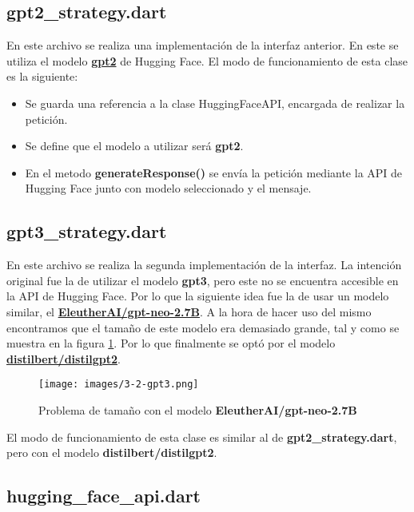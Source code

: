 \documentclass[12pt]{article}
\begin{document}
\subsection{gpt2\_strategy.dart}
En este archivo se realiza una implementación de la interfaz anterior. En este se utiliza el modelo \href{https://huggingface.co/openai-community/gpt2}{\textbf{gpt2}} de Hugging Face. El modo de funcionamiento de esta clase es la siguiente:

\begin{itemize}
    \item Se guarda una referencia a la clase HuggingFaceAPI, encargada de realizar la petición.
    \item Se define que el modelo a utilizar será \textbf{gpt2}.
    \item En el metodo \textbf{generateResponse()} se envía la petición mediante la API de Hugging Face junto con modelo seleccionado y el mensaje.
\end{itemize}

\subsection{gpt3\_strategy.dart}

En este archivo se realiza la segunda implementación de la interfaz.
La intención original fue la de utilizar el modelo \textbf{gpt3}, pero este no se encuentra accesible en la API de Hugging Face. Por lo que la siguiente idea fue la de usar un modelo similar, el \href{https://huggingface.co/EleutherAI/gpt-neo-2.7B}{\textbf{EleutherAI/gpt-neo-2.7B}}.
A la hora de hacer uso del mismo encontramos que el tamaño de este modelo era demasiado grande, tal y como se muestra en la figura \ref{fig:3-2-gpt3}. Por lo que finalmente se optó por el modelo \href{https://huggingface.co/distilbert/distilgpt2}{\textbf{distilbert/distilgpt2}}.

\begin{figure}[H]
    \centering
    \texttt{[image: images/3-2-gpt3.png]}
    \caption{Problema de tamaño con el modelo \textbf{EleutherAI/gpt-neo-2.7B}}
    \label{fig:3-2-gpt3}
\end{figure}

El modo de funcionamiento de esta clase es similar al de \textbf{gpt2\_strategy.dart}, pero con el modelo \textbf{distilbert/distilgpt2}.

\subsection{hugging\_face\_api.dart}
\end{document}
